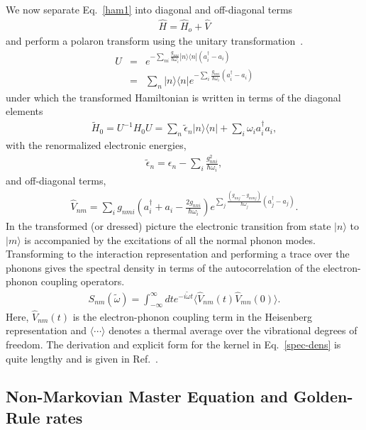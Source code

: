 We now separate Eq.~\ref{ham1} into diagonal and
off-diagonal terms
\begin{eqnarray}
\hat  H = \hat H_{o} + \hat V
\end{eqnarray}
and perform a polaron transform
using the unitary transformation~\cite{grover:2099,rice:2504,pereverzev:104906}.
\begin{eqnarray}
U&=&e^{-\sum_{ni}\!\!\frac{g_{nni}}{\hbar\omega_i}|n\rangle \langle
n|(a^{\dagger}_i-a_i)}
 \nonumber \\
&=&
\sum_{n}|n\rangle \langle n|e^{-\sum_{i}\!\!\frac{g_{nni}}{\hbar\omega_i}(a^{\dagger}_i-a_i)}
\label{unitary}
\end{eqnarray}
under which the transformed Hamiltonian is written in terms of the
diagonal elements
\begin{eqnarray} \tilde H_0=U^{-1}H_0U
=\sum_n\tilde\epsilon_n |n\rangle \langle
n|+\sum_i\omega_ia^{\dagger}_ia_i,
 \end{eqnarray}
with  the renormalized electronic energies,
\begin{eqnarray}
\tilde\epsilon_n=\epsilon_n-\sum_{i}\frac{g_{nni}^2}{\hbar\omega_i},
\end{eqnarray}
and off-diagonal terms,
\begin{eqnarray} \hat V_{nm}=\sum_{i}g_{nmi}\left(a^{\dagger}_i+
a_i-\frac{2g_{nni}}{\hbar\omega_i}\right)e^{\sum_{j}\frac{(g_{nnj}-g_{mmj})}{\hbar\omega_j}(a^{\dagger}_j-a_j)}.
\label{opm}
\end{eqnarray}
In the transformed (or dressed) picture the electronic transition from state
$|n\rangle$ to $|m\rangle$ is accompanied by the excitations of all the
normal phonon modes.  Transforming to the interaction representation
and performing a trace over the phonons gives the spectral density in
terms of the autocorrelation of the electron-phonon coupling
operators.
\begin{eqnarray}
S_{nm}(\tilde\omega) = \int_{-\infty}^{\infty} dt e^{-i\tilde \omega t}\langle \hat V_{nm}(t) \hat V_{mn}(0)\rangle.\label{spec-dens}
\end{eqnarray}
Here, $\hat V_{nm}(t)$ is the electron-phonon coupling term in the Heisenberg representation and
$\langle \cdots \rangle$ denotes a thermal average over the
vibrational degrees of freedom.
The derivation and explicit form for the kernel in Eq.~\ref{spec-dens}  is quite lengthy and is given in
Ref.~\cite{pereverzev:104906}.

\subsection{Non-Markovian Master Equation and Golden-Rule rates}

